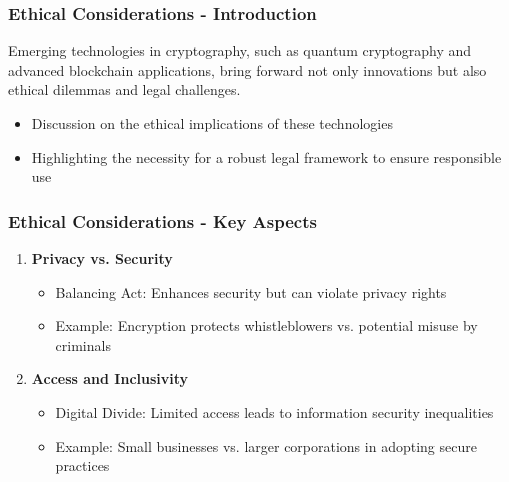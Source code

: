 \documentclass{beamer}
\begin{document}
\begin{frame}[fragile]
    \frametitle{Ethical Considerations - Introduction}
    Emerging technologies in cryptography, such as quantum cryptography and advanced blockchain applications, bring forward not only innovations but also ethical dilemmas and legal challenges. 
    \begin{itemize}
        \item Discussion on the ethical implications of these technologies 
        \item Highlighting the necessity for a robust legal framework to ensure responsible use
    \end{itemize}
\end{frame}

\begin{frame}[fragile]
    \frametitle{Ethical Considerations - Key Aspects}
    \begin{enumerate}
        \item \textbf{Privacy vs. Security}
            \begin{itemize}
                \item Balancing Act: Enhances security but can violate privacy rights
                \item Example: Encryption protects whistleblowers vs. potential misuse by criminals
            \end{itemize}
        \item \textbf{Access and Inclusivity}
            \begin{itemize}
                \item Digital Divide: Limited access leads to information security inequalities
                \item Example: Small businesses vs. larger corporations in adopting secure practices
            \end{itemize}
    \end{enumerate}
\end{frame}
\end{document}
